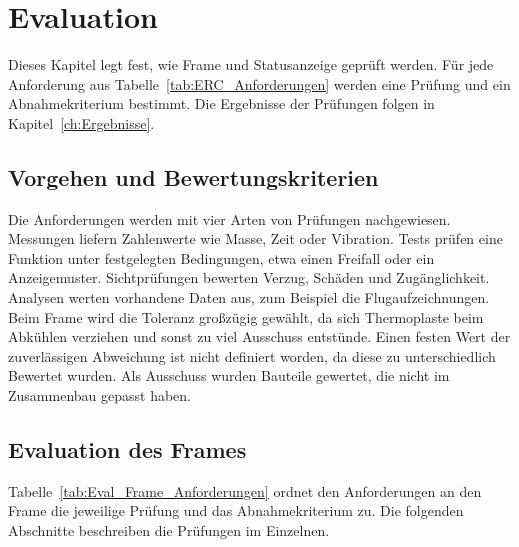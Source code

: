 \chapter{Evaluation}
\label{ch:Evaluation}

Dieses Kapitel legt fest, wie Frame und Statusanzeige geprüft werden. Für jede Anforderung aus Tabelle~\ref{tab:ERC_Anforderungen} werden eine Prüfung und ein Abnahmekriterium bestimmt. Die Ergebnisse der Prüfungen folgen in Kapitel~\ref{ch:Ergebnisse}.

    \section{Vorgehen und Bewertungskriterien}
    \label{sec:Evaluationsmethodik}

    Die Anforderungen werden mit vier Arten von Prüfungen nachgewiesen. Messungen liefern Zahlenwerte wie Masse, Zeit oder Vibration. Tests prüfen eine Funktion unter festgelegten Bedingungen, etwa einen Freifall oder ein Anzeigemuster. Sichtprüfungen bewerten Verzug, Schäden und Zugänglichkeit. Analysen werten vorhandene Daten aus, zum Beispiel die Flugaufzeichnungen. Beim Frame wird die Toleranz großzügig gewählt, da sich Thermoplaste beim Abkühlen verziehen und sonst zu viel Ausschuss entstünde. Einen festen Wert der zuverlässigen Abweichung ist nicht definiert worden, da diese zu unterschiedlich Bewertet wurden. Als Ausschuss wurden Bauteile gewertet, die nicht im Zusammenbau gepasst haben.

    \section{Evaluation des Frames}
    \label{sec:Eval_Frame}

    Tabelle~\ref{tab:Eval_Frame_Anforderungen} ordnet den Anforderungen an den Frame die jeweilige Prüfung und das Abnahmekriterium zu. Die folgenden Abschnitte beschreiben die Prüfungen im Einzelnen.

